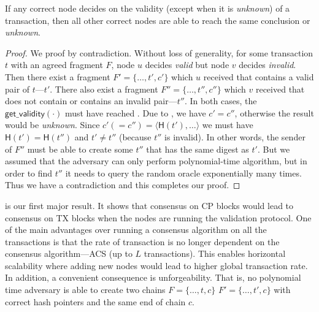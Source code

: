 \begin{theorem}
\label{theorem:validation-agreement}
If any correct node decides on the validity (except when it is \emph{unknown}) of a transaction,
then all other correct nodes are able to reach the same conclusion or \emph{unknown}.
\end{theorem}
\begin{proof}
We proof by contradiction.
Without loss of generality, for some transaction $t$ with an agreed fragment $F$,
node $u$ decides \emph{valid} but node $v$ decides \emph{invalid}.
Then there exist a fragment $F' = \{ \dots, t', c'\}$ which $u$ received that contains a valid pair of $t$---$t'$.
There also exist a fragment $F'' = \{ \dots, t'', c''\}$ which $v$ received that does not contain or contains an invalid pair---$t''$.
In both cases, the $\textsf{get\_validity}(\cdot)$ must have reached .
Due to , we have $c' = c''$, otherwise the result would be \emph{unknown}.
Since $c' (= c'') = \langle \textsf{H}(t'), \dots \rangle$ we must have $\textsf{H}(t') = \textsf{H}(t'')$ and $t' \ne t''$ (because $t''$ is invalid).
In other words, the sender of $F''$ must be able to create some $t''$ that has the same digest as $t'$.
But we assumed that the adversary can only perform polynomial-time algorithm, but in order to find $t''$ it needs to query the random oracle exponentially many times.
Thus we have a contradiction and this completes our proof.
\end{proof}

 is our first major result.
It shows that consensus on CP blocks would lead to consensus on TX blocks when the nodes are running the validation protocol.
One of the main advantages over running a consensus algorithm on all the transactions is that 
the rate of transaction is no longer dependent on the consensus algorithm---ACS (up to $L$ transactions).
This enables horizontal scalability where adding new nodes would lead to higher global transaction rate.
In addition, a convenient consequence  is unforgeability.
That is, no polynomial time adversary is able to create two chains $F = \{ \dots, t, c\}$ $F' = \{ \dots, t', c\}$ with correct hash pointers and the same end of chain $c$.

